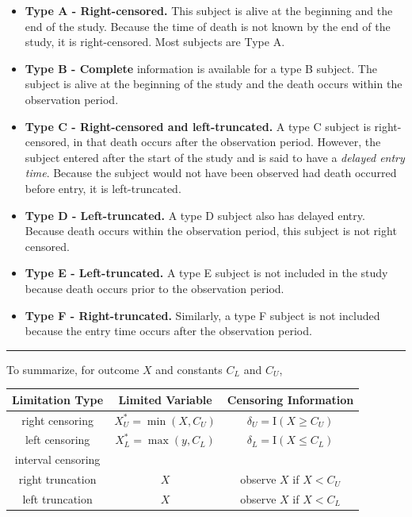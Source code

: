 \documentclass[]{book}
\providecommand{\tightlist}{%
  \setlength{\itemsep}{0pt}\setlength{\parskip}{0pt}}
\theoremstyle{definition}
\theoremstyle{definition}
\theoremstyle{definition}
\theoremstyle{remark}
\begin{document}
\begin{itemize}
\tightlist
\item
  \textbf{Type A - Right-censored.} This subject is alive at the
  beginning and the end of the study. Because the time of death is not
  known by the end of the study, it is right-censored. Most subjects are
  Type A.
\item
  \textbf{Type B - Complete} information is available for a type B
  subject. The subject is alive at the beginning of the study and the
  death occurs within the observation period.
\item
  \textbf{Type C - Right-censored and left-truncated.} A type C subject
  is right-censored, in that death occurs after the observation period.
  However, the subject entered after the start of the study and is said
  to have a \emph{delayed entry time}. Because the subject would not
  have been observed had death occurred before entry, it is
  left-truncated.
\item
  \textbf{Type D - Left-truncated.} A type D subject also has delayed
  entry. Because death occurs within the observation period, this
  subject is not right censored.
\item
  \textbf{Type E - Left-truncated.} A type E subject is not included in
  the study because death occurs prior to the observation period.
\item
  \textbf{Type F - Right-truncated.} Similarly, a type F subject is not
  included because the entry time occurs after the observation period.
\end{itemize}

\begin{center}\rule{0.5\linewidth}{\linethickness}\end{center}

To summarize, for outcome \(X\) and constants \(C_L\) and \(C_U\),

\begin{longtable}[]{@{}ccc@{}}
\toprule
Limitation Type & Limited Variable & Censoring
Information\tabularnewline
\midrule
\endhead
right censoring & \(X_U^{\ast}= \min(X, C_U)\) &
\(\delta_U= \mathrm{I}(X \geq C_U)\)\tabularnewline
left censoring & \(X_L^{\ast}= \max(y, C_L)\) &
\(\delta_L= \mathrm{I}(X \leq C_L)\)\tabularnewline
\begin{minipage}[t]{0.32\columnwidth}\centering\strut
interval censoring\strut
\end{minipage} & \begin{minipage}[t]{0.32\columnwidth}\centering\strut
\strut
\end{minipage} & \begin{minipage}[t]{0.32\columnwidth}\centering\strut
\strut
\end{minipage}\tabularnewline
right truncation & \(X\) & observe \(X\) if \(X < C_U\)\tabularnewline
left truncation & \(X\) & observe \(X\) if \(X < C_L\)\tabularnewline
\bottomrule
\end{longtable}
\end{document}
